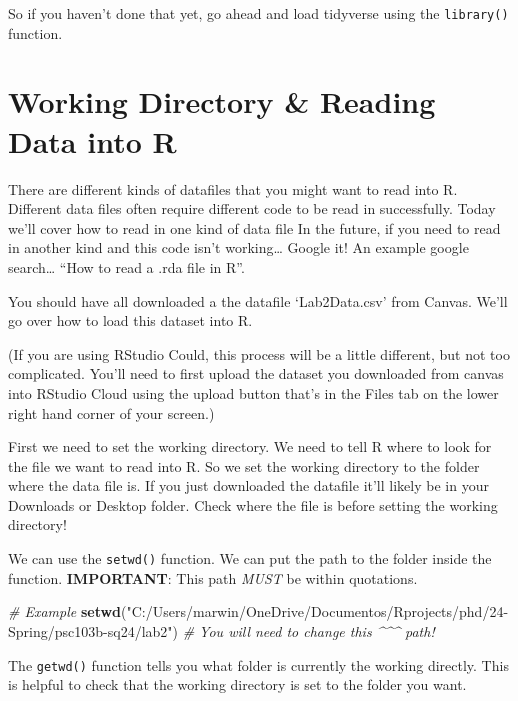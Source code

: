 \documentclass[
]{article}
\newenvironment{Shaded}{\begin{snugshade}}{\end{snugshade}}
\newcommand{\CommentTok}[1]{\textcolor[rgb]{0.56,0.35,0.01}{\textit{#1}}}
\newcommand{\FunctionTok}[1]{\textcolor[rgb]{0.13,0.29,0.53}{\textbf{#1}}}
\newcommand{\NormalTok}[1]{#1}
\newcommand{\StringTok}[1]{\textcolor[rgb]{0.31,0.60,0.02}{#1}}
\begin{document}
So if you haven't done that yet, go ahead and load tidyverse using the
\texttt{library()} function.

\hypertarget{working-directory-reading-data-into-r}{%
\section{Working Directory \& Reading Data into
R}\label{working-directory-reading-data-into-r}}

There are different kinds of datafiles that you might want to read into
R. Different data files often require different code to be read in
successfully. Today we'll cover how to read in one kind of data file In
the future, if you need to read in another kind and this code isn't
working\ldots{} Google it! An example google search\ldots{} ``How to
read a .rda file in R''.

You should have all downloaded a the datafile `Lab2Data.csv' from
Canvas. We'll go over how to load this dataset into R.

(If you are using RStudio Could, this process will be a little
different, but not too complicated. You'll need to first upload the
dataset you downloaded from canvas into RStudio Cloud using the upload
button that's in the Files tab on the lower right hand corner of your
screen.)

First we need to set the working directory. We need to tell R where to
look for the file we want to read into R. So we set the working
directory to the folder where the data file is. If you just downloaded
the datafile it'll likely be in your Downloads or Desktop folder. Check
where the file is before setting the working directory!

We can use the \texttt{setwd()} function. We can put the path to the
folder inside the function. \textbf{IMPORTANT}: This path \emph{MUST} be
within quotations.

\begin{Shaded}
\begin{Highlighting}[]
\CommentTok{\# Example}
\FunctionTok{setwd}\NormalTok{(}\StringTok{"C:/Users/marwin/OneDrive/Documentos/Rprojects/phd/24{-}Spring/psc103b{-}sq24/lab2"}\NormalTok{) }
       \CommentTok{\# You will need to change this \^{}\^{}\^{} path!}
\end{Highlighting}
\end{Shaded}

The \texttt{getwd()} function tells you what folder is currently the
working directly. This is helpful to check that the working directory is
set to the folder you want.
\end{document}
